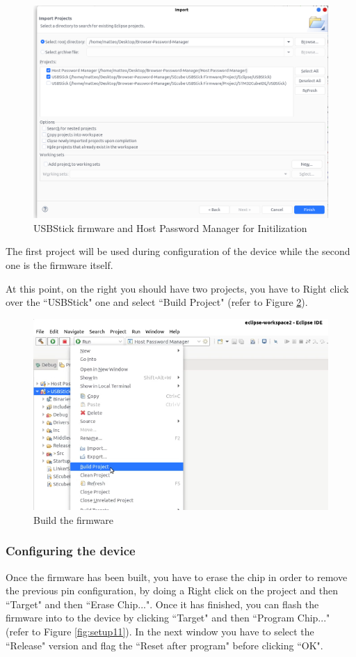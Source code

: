 \begin{figure}[H]
	\centering
	\includegraphics[width=0.6\linewidth]{images/firmware/setup_8}
	\caption{USBStick firmware and Host Password Manager for Initilization}
	\label{fig:setup8}
\end{figure}

The first project will be used during configuration of the device while the second one is the firmware itself.

At this point, on the right you should have two projects, you have to Right click over the ``USBStick" one and select ``Build Project" (refer to Figure \ref{fig:setup10}).
\begin{figure}[H]
	\centering
	\includegraphics[width=0.55\linewidth]{images/firmware/setup_10}
	\caption{Build the firmware}
	\label{fig:setup10}
\end{figure}

\subsubsection{Configuring the device}
\label{sec:firm_configure}
Once the firmware has been built, you have to erase the chip in order to remove the previous pin configuration, by doing a Right click on the project and then ``Target" and then ``Erase Chip...". Once it has finished, you can flash the firmware into to the device by clicking ``Target" and then ``Program Chip..." (refer to Figure \ref{fig:setup11}). In the next window you have to select the ``Release" version and flag the ``Reset after program" before clicking ``OK".

